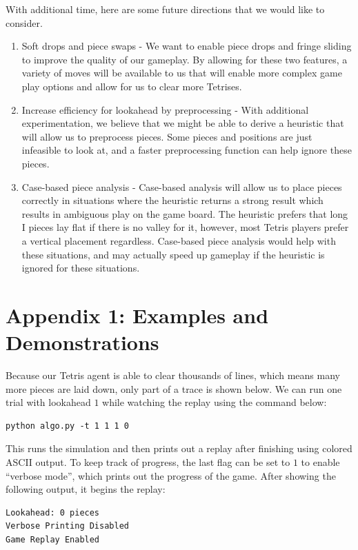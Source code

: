 \documentclass[12pt]{article}
\begin{document}
With additional time, here are some future directions that we would like to consider.
\begin{enumerate}
\item Soft drops and piece swaps - We want to enable piece drops and fringe sliding to improve the quality of our gameplay. By allowing for these two features, a variety of moves will be available to us that will enable more complex game play options and allow for us to clear more Tetrises.
\item Increase efficiency for lookahead by preprocessing - With additional experimentation, we believe that we might be able to derive a heuristic that will allow us to preprocess pieces. Some pieces and positions are just infeasible to look at, and a faster preprocessing function can help ignore these pieces.
\item Case-based piece analysis - Case-based analysis will allow us to place pieces correctly in situations where the heuristic returns a strong result which results in ambiguous play on the game board. The heuristic prefers that long I pieces lay flat if there is no valley for it, however, most Tetris players prefer a vertical placement regardless. Case-based piece analysis would help with these situations, and may actually speed up gameplay if the heuristic is ignored for these situations.
\end{enumerate}

\section{Appendix 1: Examples and Demonstrations}

Because our Tetris agent is able to clear thousands of lines, which means many more pieces are laid down, only part of a trace is shown below. We can run one trial with lookahead $1$ while watching the replay using the command below:

\begin{verbatim}
python algo.py -t 1 1 1 0
\end{verbatim}

This runs the simulation and then prints out a replay after finishing using colored ASCII output. To keep track of progress, the last flag can be set to $1$ to enable ``verbose mode'', which prints out the progress of the game. After showing the following output, it begins the replay:

\begin{verbatim}
Lookahead: 0 pieces
Verbose Printing Disabled
Game Replay Enabled
\end{verbatim}
\end{document}
